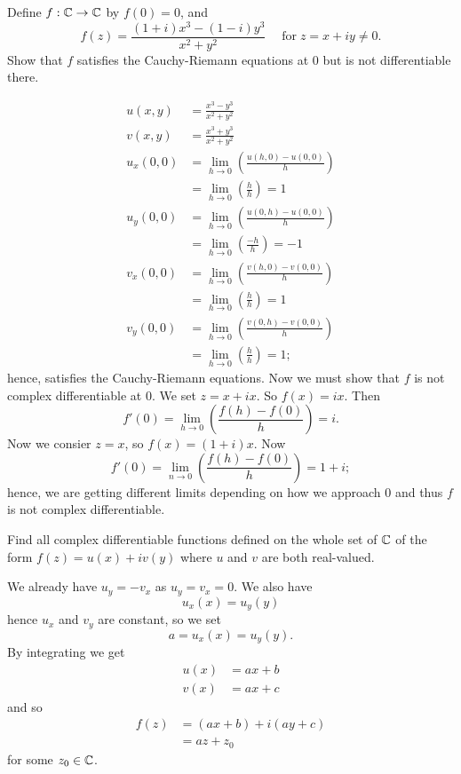 \setcounter{question}{3}
\question Define $f: \mathbb{C} \to \mathbb{C}$ by $f(0) = 0$, and
\[ f(z) = \frac{(1+i)x^3 - (1-i)y^3}{x^2 + y^2} \quad \;\text{for}\; z = x + iy \neq 0. \]
Show that $f$ satisfies the Cauchy-Riemann equations at $0$ but is not differentiable there.
\begin{solution}
    \begin{align*}
        u(x, y)   &= \frac{x^3 - y^3}{x^2 + y^2} \\
        v(x, y)   &= \frac{x^3 + y^3}{x^2 + y^2} \\ 
        u_x(0, 0) &= \lim_{h \to 0} \left( \frac{u(h, 0) - u(0, 0)}{h} \right) \\
                  &= \lim_{h \to 0} \left( \frac{h}{h} \right) = 1 \\
        u_y(0, 0) &= \lim_{h \to 0} \left( \frac{u(0, h) - u(0, 0)}{h} \right) \\
                  &= \lim_{h \to 0} \left( \frac{-h}{h} \right) = -1 \\
        v_x(0, 0) &= \lim_{h \to 0} \left( \frac{v(h, 0) - v(0, 0)}{h} \right) \\
                  &= \lim_{h \to 0} \left( \frac{h}{h} \right) = 1 \\
        v_y(0, 0) &= \lim_{h \to 0} \left( \frac{v(0, h) - v(0, 0)}{h} \right) \\
                  &= \lim_{h \to 0} \left( \frac{h}{h} \right) = 1;
    \end{align*}
    hence, satisfies the Cauchy-Riemann equations. Now we must show that $f$ is not complex differentiable at $0$. We set $z = x + ix$. So $f(x) = ix$. Then 
    \[ f'(0) = \lim_{h \to 0} \left(\frac{f(h) - f(0)}{h}\right) = i. \]
    Now we consier $z = x$, so $f(x) = (1+i)x$. Now
    \[ f'(0) = \lim_{n \to 0} \left( \frac{f(h) - f(0)}{h}\right) = 1 + i; \]
    hence, we are getting different limits depending on how we approach $0$ and thus $f$ is not complex differentiable.
\end{solution}

\setcounter{question}{5}
\question Find all complex differentiable functions defined on the whole set of $\mathbb{C}$ of the form $f(z) = u(x) + iv(y)$ where $u$ and $v$ are both real-valued.
\begin{solution}
    We already have $u_y = -v_x$ as $u_y = v_x = 0$. We also have
    \[ u_x(x) = u_y(y) \]
    hence $u_x$ and $v_y$ are constant, so we set
    \[ a = u_x(x) = u_y(y). \]
    By integrating we get
    \begin{align*}
        u(x) &= ax + b \\
        v(x) &= ax + c
    \end{align*}
    and so 
    \begin{align*}
        f(z) &= (ax + b) + i(ay + c) \\
             &= az + z_0
    \end{align*}
    for some $z_0 \in \mathbb{C}$.
\end{solution}
